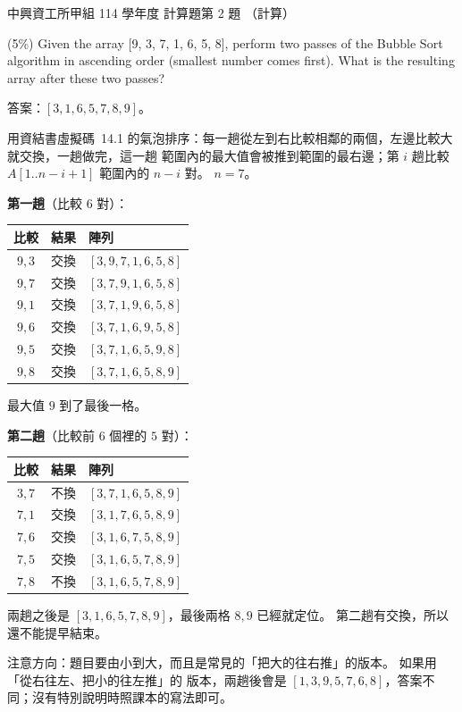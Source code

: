 \begin{pastexam}[label={px:nchu-114-dsa-22}]{中興資工所甲組 114 學年度 計算題第 2 題}
（計算）

(5\%) Given the array [9, 3, 7, 1, 6, 5, 8], perform two passes of the Bubble Sort algorithm in ascending order (smallest number comes first). What is the resulting array after these two passes?
\end{pastexam}

\begin{pastsoln}
答案：$[3, 1, 6, 5, 7, 8, 9]$。

用資結書虛擬碼~14.1 的氣泡排序：每一趟從左到右比較相鄰的兩個，左邊比較大就交換，一趟做完，這一趟
範圍內的最大值會被推到範圍的最右邊；第 $i$ 趟比較 $A[1..n - i + 1]$ 範圍內的 $n - i$ 對。 $n = 7$。

\textbf{第一趟}（比較 $6$ 對）：
\begin{center}
\begin{tabular}{cll}
\toprule
比較 & 結果 & 陣列 \\
\midrule
$9, 3$ & 交換 & $[3, 9, 7, 1, 6, 5, 8]$ \\
$9, 7$ & 交換 & $[3, 7, 9, 1, 6, 5, 8]$ \\
$9, 1$ & 交換 & $[3, 7, 1, 9, 6, 5, 8]$ \\
$9, 6$ & 交換 & $[3, 7, 1, 6, 9, 5, 8]$ \\
$9, 5$ & 交換 & $[3, 7, 1, 6, 5, 9, 8]$ \\
$9, 8$ & 交換 & $[3, 7, 1, 6, 5, 8, 9]$ \\
\bottomrule
\end{tabular}
\end{center}
最大值 $9$ 到了最後一格。

\textbf{第二趟}（比較前 $6$ 個裡的 $5$ 對）：
\begin{center}
\begin{tabular}{cll}
\toprule
比較 & 結果 & 陣列 \\
\midrule
$3, 7$ & 不換 & $[3, 7, 1, 6, 5, 8, 9]$ \\
$7, 1$ & 交換 & $[3, 1, 7, 6, 5, 8, 9]$ \\
$7, 6$ & 交換 & $[3, 1, 6, 7, 5, 8, 9]$ \\
$7, 5$ & 交換 & $[3, 1, 6, 5, 7, 8, 9]$ \\
$7, 8$ & 不換 & $[3, 1, 6, 5, 7, 8, 9]$ \\
\bottomrule
\end{tabular}
\end{center}
兩趟之後是 $[3, 1, 6, 5, 7, 8, 9]$，最後兩格 $8, 9$ 已經就定位。 第二趟有交換，所以還不能提早結束。

注意方向：題目要由小到大，而且是常見的「把大的往右推」的版本。 如果用「從右往左、把小的往左推」的
版本，兩趟後會是 $[1, 3, 9, 5, 7, 6, 8]$，答案不同；沒有特別說明時照課本的寫法即可。
\end{pastsoln}
